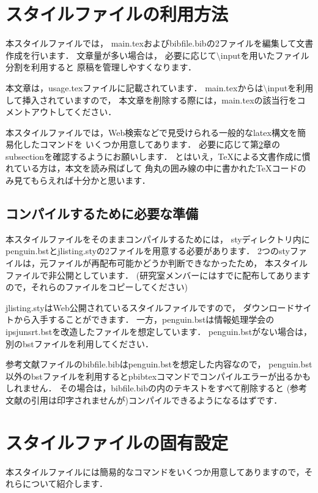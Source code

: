 \section{スタイルファイルの利用方法}
\label{sec:usage}

本スタイルファイルでは，
main.texおよびbibfile.bibの2ファイルを編集して文書作成を行います．
文章量が多い場合は，
必要に応じて$\setminus$inputを用いたファイル分割を利用すると
原稿を管理しやすくなります．

本文章は，usage.texファイルに記載されています．
main.texからは$\setminus$inputを利用して挿入されていますので，
本文章を削除する際には，main.texの該当行をコメントアウトしてください．

本スタイルファイルでは，Web検索などで見受けられる一般的なlatex構文を簡易化したコマンドを
いくつか用意してあります．
必要に応じて第\ref{sec:master}章のsubsectionを確認するようにお願いします．
とはいえ，TeXによる文書作成に慣れている方は，本文を読み飛ばして
角丸の囲み線の中に書かれたTeXコードのみ見てもらえれば十分かと思います．

\subsection{コンパイルするために必要な準備}
本スタイルファイルをそのままコンパイルするためには，
styディレクトリ内にpenguin.bstとjlisting.styの2ファイルを用意する必要があります．
2つのstyファイルは，元ファイルが再配布可能かどうか判断できなかったため，
本スタイルファイルで非公開としています．
(研究室メンバーにはすでに配布してありますので，それらのファイルをコピーしてください)

jlisting.styはWeb公開されているスタイルファイルですので，
ダウンロードサイトから入手することができます．
一方，penguin.bstは情報処理学会のipsjunsrt.bstを改造したファイルを想定しています．
penguin.bstがない場合は，別のbstファイルを利用してください．

参考文献ファイルのbibfile.bibはpenguin.bstを想定した内容なので，
penguin.bst以外のbstファイルを利用するとpbibtexコマンドでコンパイルエラーが出るかもしれません．
その場合は，bibfile.bibの内のテキストをすべて削除すると
(参考文献の引用は印字されませんが)コンパイルできるようになるはずです．

\section{スタイルファイルの固有設定}
\label{sec:master}
本スタイルファイルには簡易的なコマンドをいくつか用意してありますので，それらについて紹介します．

